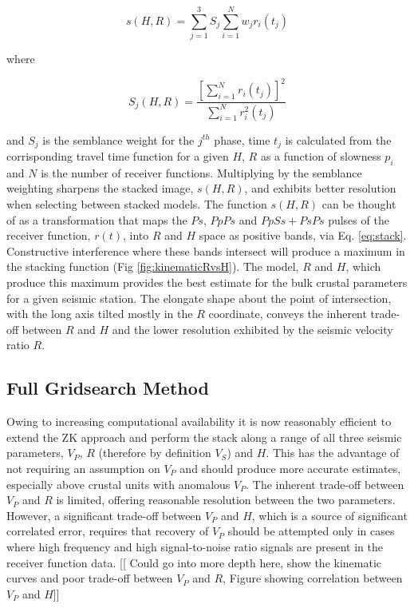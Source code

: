 \documentclass[draft, 12pt]{article}
\begin{document}
\begin{equation}  \label{eq:stack}
s(H,R) = \sum_{j=1}^{3} S_j \sum_{i=1}^N w_jr_i(t_j)
\end{equation}

where

\begin{equation}
S_j(H,R) = \frac {\left[ \sum_{i=1}^N r_i(t_j) \right]^2}
                 { \sum_{i=1}^N r_i^2(t_j) }
\end{equation}

and $S_j$ is the semblance weight for the $j^{th}$ phase, time $t_j$ is calculated from the corrisponding travel time function for a given $H$, $R$ as a function of slowness $p_i$ and $N$ is the number of receiver functions. Multiplying by the semblance weighting sharpens the stacked image, $s(H,R)$, and exhibits better resolution when selecting between stacked models. The function $s(H,R)$ can be thought of as a transformation that maps the $Ps$, $PpPs$ and $PpSs+PsPs$ pulses of the receiver function, $r(t)$,  into $R$ and $H$ space as positive bands, via Eq. \ref{eq:stack}. Constructive interference where these bands intersect will produce a maximum in the stacking function (Fig \ref{fig:kinematicRvsH}). The model, $R$ and $H$, which produce this maximum provides the best estimate for the bulk crustal parameters for a given seismic station. The elongate shape about the point of intersection, with the long axis tilted mostly in the $R$ coordinate, conveys the inherent trade-off between $R$ and $H$ and the lower resolution exhibited by the seismic velocity ratio $R$.

\subsection{Full Gridsearch Method}

  Owing to increasing computational availability it is now reasonably efficient to extend the ZK approach and perform the stack along a range of all three seismic parameters, $V_P$, $R$ (therefore by definition $V_S$) and $H$. This has the advantage of not requiring an assumption on $V_P$ and should produce more accurate estimates, especially above crustal units with anomalous $V_P$. The inherent trade-off between $V_P$ and $R$ is limited, offering reasonable resolution between the two parameters. However, a significant trade-off between $V_P$ and $H$, which is a source of significant correlated error, requires that recovery of $V_P$ should be attempted only in cases where high frequency and high signal-to-noise ratio signals are present in the receiver function data. [[ Could go into more depth here, show the kinematic curves and poor trade-off between $V_P$ and $R$, Figure showing correlation between $V_P$ and $H$]]
\end{document}

